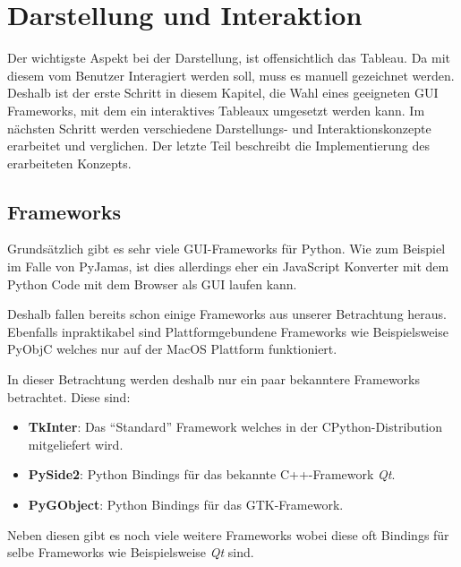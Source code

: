 
\chapter{Darstellung und Interaktion}
Der wichtigste Aspekt bei der Darstellung, ist offensichtlich das Tableau. Da mit diesem vom Benutzer Interagiert werden soll, muss es manuell gezeichnet werden. Deshalb ist der erste Schritt in diesem Kapitel, die Wahl eines geeigneten \ac{GUI} Frameworks, mit dem ein interaktives Tableaux umgesetzt werden kann. Im nächsten Schritt werden verschiedene Darstellungs- und Interaktionskonzepte erarbeitet und verglichen. Der letzte Teil beschreibt die Implementierung des erarbeiteten Konzepts.

\section{Frameworks}
Grundsätzlich gibt es sehr viele \ac{GUI}-Frameworks für Python. Wie zum Beispiel im Falle von PyJamas, ist dies allerdings eher ein JavaScript Konverter mit dem Python Code mit dem Browser als \ac{GUI} laufen kann.

Deshalb fallen bereits schon einige Frameworks aus unserer Betrachtung heraus. Ebenfalls inpraktikabel sind Plattformgebundene Frameworks wie Beispielsweise PyObjC welches nur auf der MacOS Plattform funktioniert.

In dieser Betrachtung werden deshalb nur ein paar bekanntere Frameworks betrachtet. Diese sind:
\begin{itemize}
\item \textbf{TkInter}: Das ``Standard'' Framework welches in der CPython-Distribution mitgeliefert wird.

\item \textbf{PySide2}: Python Bindings für das bekannte C++-Framework \textit{Qt}.

\item \textbf{PyGObject}: Python Bindings für das GTK-Framework.
\end{itemize}
Neben diesen gibt es noch viele weitere Frameworks wobei diese oft Bindings für selbe Frameworks wie Beispielsweise \textit{Qt} sind.

